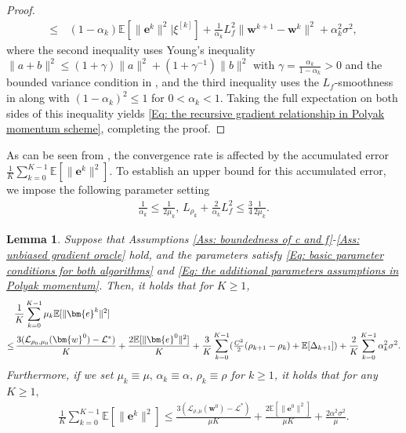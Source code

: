 \documentclass{article}
\theoremstyle{plain}
\newtheorem{lemma}{Lemma}[section]
\theoremstyle{definition}
\theoremstyle{remark}
\newcommand{\EE}{\mathbb{E}}
\newcommand{\be}{\bm{e}}
\newcommand{\calL}{\mathcal{L}}
\newcommand{\bw}{\bm{w}}
\newcommand{\sumK}{\sum_{k=0}^{K-1}}
\numberwithin{equation}{section}
\begin{document}
\begin{proof}
\begin{align}
\leq&\, (1-\alpha_k)\EE[\|\be^k\|^2|\xi^{[k]}] + \frac{1}{\alpha_k}L_f^2\|\bw^{k+1}- \bw^{k}\|^{2} + \alpha_k^2 \sigma^2,
\end{align}
where the second inequality uses Young's inequality $\|a+b\|^2 \leq (1+\gamma)\|a\|^2 + (1+\gamma^{-1})\|b\|^2$ with $\gamma = \frac{\alpha_k}{1-\alpha_k} > 0$ and the bounded variance condition in , and the third inequality uses the $L_f$-smoothness in  along with $(1-\alpha_k)^2 \leq 1$ for $0 < \alpha_k < 1$. Taking the full expectation on both sides of this inequality yields \eqref{Eq: the recursive gradient relationship in Polyak momentum scheme}, completing the proof.
\end{proof}
As can be seen from , the convergence rate is affected by the accumulated error $\frac{1}{K}\sum_{k=0}^{K-1} \EE [\|\be^{k}\|^{2}]$. To establish an upper bound for this accumulated error, we impose the following parameter setting
\begin{align}
    \label{Eq: the additional parameters assumptions in Polyak momentum}
   \frac{1}{\alpha_{k}}\leq \frac{1}{2\mu_{k}}, \, L_{\rho_k}+ \frac{2}{\alpha_{k}}L^2_{f}\leq \frac{3}{4}\frac{1}{2\mu_{k}}.
\end{align}
\begin{lemma}
    \label{Lemma: Weighted error accumulation of Polyak} Suppose that Assumptions \ref{Ass: boundedness of c and f}-\ref{Ass: unbiased gradient oracle} hold, and the
    parameters satisfy \eqref{Eq: basic parameter conditions for both algorithms}
    and \eqref{Eq: the additional parameters assumptions in Polyak momentum}. Then,
    it holds that  for $K\geq 1$,
        \begin{align}
        \label{Eq: weighted cumulative error bound for Polyak}
        &\frac{1}{K}\sumK \mu_{k}\EE [\| \be^{k}\|^{2}]  \notag \\
        \leq&\,\frac{ 3( \calL_{\rho_0, \mu_0}(\bw^{0}) - \calL^{*})}{K}+ \frac{2 \EE [\| \be^{0}\|^{2}]}{K}+ \frac{3}{K}\sumK ( \tfrac{C^2}{2} (\rho_{k+1}- \rho_{k}) + \EE[\Delta_{k+1}] ) + \frac{2}{K}\sumK \alpha_{k}^{2}\sigma^{2}.
    \end{align}
Furthermore, if we set
    $\mu_{k}\equiv \mu , \, \alpha_{k}\equiv \alpha ,\, \rho_{k}\equiv \rho$
    for $k \geq 1$, it holds that for any $K\ge1,$
    \begin{align}
        \label{Eq: weighted cumulative error bound under constant parameters for Polyak}\frac{1}{K}\sumK \EE [ \| \be^{k}\|^{2}] \leq \frac{ 3 ( \calL_{\rho, \mu}(\bw^{0}) - \calL^{*}) }{\mu K}+ \frac{2\EE [\| \be^{0}\|^{2}]}{\mu K}+ \frac{2\alpha^{2}\sigma^{2}}{\mu}.
    \end{align}
\end{lemma}
\end{document}
